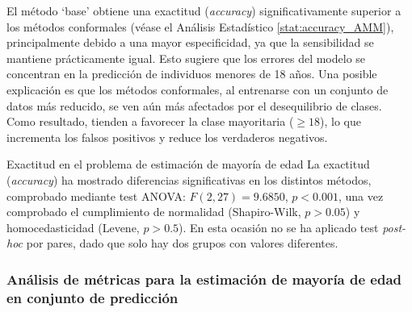 \begin{table}[h]
    \caption[
        Problema de estimación de mayoría de edad: 
        Exactitud, sensibilidad y especifidad obtenidos por cada método de predicción a lo largo de distintas ejecuciones. 
    ]{   
        Exactitud, sensibilidad y especifidad obtenidos por cada método de predicción a lo largo de distintas ejecuciones. 
        Se presentan los valores para cada ejecución individual, así como la media final de cada métrica.
        `CP' se refiere a los métodos conformales empleados: LAC y MCM (se recuerda que es el mismo modelo para todos los métodos conformales y, por ello, presentan los mismas predicciones puntuales). Se marca en negrita la media con mejor valor para cada métrica. 
    }
    \label{tab:AMM_accuracy_comparative}
\end{table}

El método `base' obtiene una exactitud (\textit{accuracy}) significativamente superior a los métodos conformales (véase el Análisis Estadístico \ref{stat:accuracy_AMM}), 
principalmente debido a una mayor especificidad, ya que la sensibilidad se mantiene prácticamente igual. Esto sugiere que los errores del modelo se concentran en la predicción de individuos menores de 18 años. Una posible explicación es que los métodos conformales, al entrenarse con un conjunto de datos más reducido, se ven aún más afectados por el desequilibrio de clases. Como resultado, tienden a favorecer la clase mayoritaria ($\ge 18$), lo que incrementa los falsos positivos y reduce los verdaderos negativos.


\begin{StatisticsRef}{Exactitud en el problema de estimación de mayoría de edad}
    La exactitud (\textit{accuracy}) ha mostrado diferencias significativas en los distintos métodos, comprobado mediante test ANOVA: $F(2, 27) = 9.6850$, $p < 0.001$, una vez comprobado el cumplimiento de normalidad (Shapiro-Wilk, $p>0.05$) y homocedasticidad (Levene, $p>0.5$). En esta ocasión no se ha aplicado test \textit{post-hoc} por pares, dado que solo hay dos grupos con valores diferentes.
\end{StatisticsRef}


\FloatBarrier


\subsubsection{Análisis de métricas para la estimación de mayoría de edad en conjunto de predicción}

